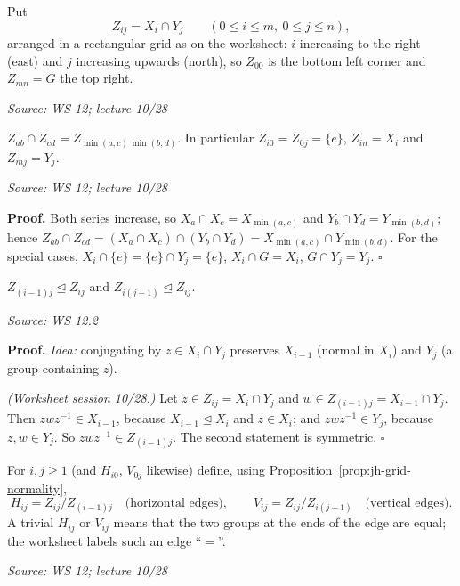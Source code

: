 \documentclass[11pt]{report}
\renewenvironment{proof}[1][Proof]{\noindent\textbf{#1.} }{\hfill$\square$\par\vspace{5pt}}
\newcommand{\srcline}[1]{\par\hfill{\footnotesize\textit{Source: #1}}}
\begin{document}
\begin{defbox}\label{def:jh-grid}
Put
\[ Z_{ij} = X_i \cap Y_j \qquad (0 \leq i \leq m,\ 0 \leq j \leq n), \]
arranged in a rectangular grid as on the worksheet: $i$ increasing to the right (east) and $j$ increasing upwards (north), so $Z_{00}$ is the bottom left corner and $Z_{mn} = G$ the top right.
\srcline{WS 12; lecture 10/28}
\end{defbox}

\begin{lembox}\label{lem:jh-grid-intersections}
$Z_{ab} \cap Z_{cd} = Z_{\min(a,c)\,\min(b,d)}$. In particular $Z_{i0} = Z_{0j} = \{e\}$, $Z_{in} = X_i$ and $Z_{mj} = Y_j$.
\srcline{WS 12; lecture 10/28}
\end{lembox}

\begin{proof}
Both series increase, so $X_a \cap X_c = X_{\min(a,c)}$ and $Y_b \cap Y_d = Y_{\min(b,d)}$; hence $Z_{ab} \cap Z_{cd} = (X_a \cap X_c) \cap (Y_b \cap Y_d) = X_{\min(a,c)} \cap Y_{\min(b,d)}$. For the special cases, $X_i \cap \{e\} = \{e\} \cap Y_j = \{e\}$, $X_i \cap G = X_i$, $G \cap Y_j = Y_j$.
\end{proof}

\begin{propbox}\label{prop:jh-grid-normality}
$Z_{(i-1)j} \trianglelefteq Z_{ij}$ and $Z_{i(j-1)} \trianglelefteq Z_{ij}$.
\srcline{WS 12.2}
\end{propbox}

\begin{proof}
\textit{Idea:} conjugating by $z \in X_i \cap Y_j$ preserves $X_{i-1}$ (normal in $X_i$) and $Y_j$ (a group containing $z$).\par
\textit{(Worksheet session 10/28.)} Let $z \in Z_{ij} = X_i \cap Y_j$ and $w \in Z_{(i-1)j} = X_{i-1} \cap Y_j$. Then $zwz^{-1} \in X_{i-1}$, because $X_{i-1} \trianglelefteq X_i$ and $z \in X_i$; and $zwz^{-1} \in Y_j$, because $z, w \in Y_j$. So $zwz^{-1} \in Z_{(i-1)j}$. The second statement is symmetric.
\end{proof}

\begin{defbox}\label{def:jh-edge-quotients}
For $i, j \geq 1$ (and $H_{i0}$, $V_{0j}$ likewise) define, using Proposition~\ref{prop:jh-grid-normality},
\[ H_{ij} = Z_{ij}/Z_{(i-1)j} \quad \text{(horizontal edges)}, \qquad V_{ij} = Z_{ij}/Z_{i(j-1)} \quad \text{(vertical edges)}. \]
A trivial $H_{ij}$ or $V_{ij}$ means that the two groups at the ends of the edge are equal; the worksheet labels such an edge ``$=$''.
\srcline{WS 12; lecture 10/28}
\end{defbox}
\end{document}
